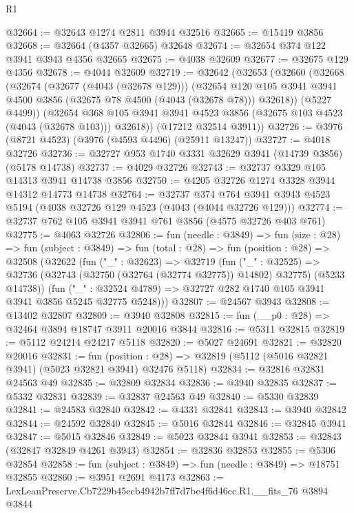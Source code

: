 \begin{lexlean}{R1}
\begin{coremodule}
@32664 := @32643 @1274 @2811 @3944 @32516
@32665 := @15419 @3856
@32668 := @32664 (@4357 @32665) @32648
@32674 := @32654 @374 @122 @3941 @3943 @4356 @32665
@32675 := @4038 @32609
@32677 := @32675 @129 @4356
@32678 := @4044 @32609
@32719 := @32642
    (@32653
      (@32660
        (@32668
          (@32674
            (@32677 (@4043 (@32678 @129)))
            (@32654
              @120
              @105
              @3941
              @3941
              @4500
              @3856
              (@32675 @78 @4500 (@4043 (@32678 @78)))
              @32618))
          (@5227 @4499))
        (@32654 @368 @105 @3941 @3941 @4523 @3856 (@32675 @103 @4523 (@4043 (@32678 @103))) @32618))
      (@17212 @32514 @3911))
@32726 := @3976 (@8721 @4523) (@3976 (@4593 @4496) (@25911 @13247))
@32727 := @4018 @32726
@32736 := @32727 @953 @1740 @3331 @32629 @3941 (@14739 @3856) (@5178 @14738)
@32737 := @4029 @32726
@32743 := @32737 @3329 @105 @14313 @3941 @14738 @3856
@32750 := @4205 @32726 @1274 @3328 @3944 @14312 @14773 @14738
@32764 := @32737
    @374
    @764
    @3941
    @3943
    @4523
    @5194
    (@4038 @32726 @129 @4523 (@4043 (@4044 @32726 @129)))
@32774 := @32737 @762 @105 @3941 @3941 @761 @3856 (@4575 @32726 @403 @761)
@32775 := @4063 @32726
@32806 := fun (needle : @3849) =>
  fun (size : @28) =>
  fun (subject : @3849) =>
  fun (total : @28) =>
  fun (position : @28) =>
  @32508
    (@32622
      (fun ("_" : @32623) =>
      @32719
        (fun ("_" : @32525) =>
        @32736 (@32743 (@32750 (@32764 (@32774 @32775)) @14802) @32775) (@5233 @14738))
        (fun ("_" : @32524 @4789) => @32727 @282 @1740 @105 @3941 @3941 @3856 @5245 @32775 @5248)))
@32807 := @24567 @3943
@32808 := @13402 @32807
@32809 := @3940 @32808
@32815 := fun (__p0 : @28) => @32464 @3894 @18747 @3911 @20016 @3844
@32816 := @5311 @32815
@32819 := @5112 @24214 @24217 @5118
@32820 := @5027 @24691
@32821 := @32820 @20016
@32831 := fun (position : @28) =>
  @32819 (@5112 (@5016 @32821 @3941) (@5023 @32821 @3941) @32476 @5118)
@32834 := @32816 @32831 @24563 @49
@32835 := @32809 @32834
@32836 := @3940 @32835
@32837 := @5332 @32831
@32839 := @32837 @24563 @49
@32840 := @5330 @32839
@32841 := @24583 @32840
@32842 := @4331 @32841
@32843 := @3940 @32842
@32844 := @24592 @32840
@32845 := @5016 @32844
@32846 := @32845 @3941
@32847 := @5015 @32846
@32849 := @5023 @32844 @3941
@32853 := @32843 (@32847 @32849 @4261 @3943)
@32854 := @32836 @32853
@32855 := @5306 @32854
@32858 := fun (subject : @3849) => fun (needle : @3849) => @18751 @32855
@32860 := @3951 @2691 @4173
@32863 := LexLeanPreserve.Cb7229b45ecb4942b7ff7d7be4f6d46cc.R1.__fits_76 @3894 @3844

\end{coremodule}
\end{lexlean}
